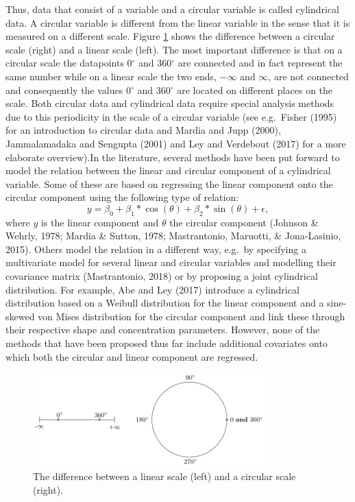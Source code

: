 \documentclass[man]{apa6}
\theoremstyle{definition}
\theoremstyle{definition}
\theoremstyle{definition}
\theoremstyle{remark}
\begin{document}
Thus, data that consist of a variable and a circular variable is called
cylindrical data. A circular variable is different from the linear
variable in the sense that it is measured on a different scale. Figure
\ref{circline} shows the difference between a circular scale (right) and
a linear scale (left). The most important difference is that on a
circular scale the datapoints 0\(^\circ\) and 360\(^\circ\) are
connected and in fact represent the same number while on a linear scale
the two ends, \(-\infty\) and \(\infty\), are not connected and
consequently the values 0\(^\circ\) and 360\(^\circ\) are located on
different places on the scale. Both circular data and cylindrical data
require special analysis methods due to this periodicity in the scale of
a circular variable (see e.g.~Fisher (1995) for an introduction to
circular data and Mardia and Jupp (2000), Jammalamadaka and Sengupta
(2001) and Ley and Verdebout (2017) for a more elaborate
overview).\newline \indent In the literature, several methods have been
put forward to model the relation between the linear and circular
component of a cylindrical variable. Some of these are based on
regressing the linear component onto the circular component using the
following type of relation: \[y = \beta_0 +
\beta_1*\cos(\theta) + \beta_2*\sin(\theta)+ \epsilon,\] where \(y\) is
the linear component and \(\theta\) the circular component (Johnson \&
Wehrly, 1978; Mardia \& Sutton, 1978; Mastrantonio, Maruotti, \&
Jona-Lasinio, 2015). Others model the relation in a different way,
e.g.~by specifying a multivariate model for several linear and circular
variables and modelling their covariance matrix (Mastrantonio, 2018) or
by proposing a joint cylindrical distribution. For example, Abe and Ley
(2017) introduce a cylindrical distribution based on a Weibull
distribution for the linear component and a sine-skewed von Mises
distribution for the circular component and link these through their
respective shape and concentration parameters. However, none of the
methods that have been proposed thus far include additional covariates
onto which both the circular and linear component are regressed.

\begin{figure}
\centering
\includegraphics[width = 0.8\textwidth]{Plots/circline.pdf}
\caption{The difference between a linear scale (left) and a circular scale (right).}
\label{circline}
\end{figure}
\end{document}
